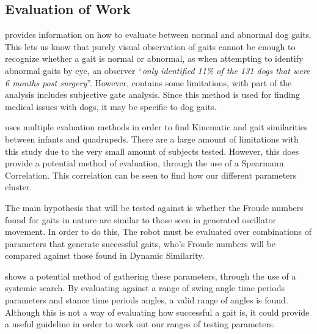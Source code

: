\subsection{Evaluation of Work}



\cite{Carr2016} provides information on how to evaluate between normal and abnormal dog gaits. This lets us know that purely visual observation of gaits cannot be enough to recognize whether a gait is normal or abnormal, as when attempting to identify abnormal gaits by eye, an observer ``\textit{only identified 11\% of the 131 dogs that were 6 months post surgery}''. However, \cite{Carr2016} contains some limitations, with part of the analysis includes subjective gate analysis. Since this method is used for finding medical issues with dogs, it may be specific to dog gaits.

\citep{Righetti2015} uses multiple evaluation methods in order to find Kinematic and gait similarities between infants and quadrupeds. There are a large amount of limitations with this study due to the very small amount of subjects tested. However, this does provide a potential method of evaluation, through the use of a Spearmann Correlation. This correlation can be seen to find how our different parameters cluster.

The main hypothesis that will be tested against is whether the Froude numbers found for gaits in nature are similar to those seen in generated oscillator movement. In order to do this, The robot must be evaluated over combinations of parameters that generate successful gaits, who's Froude numbers will be compared against those found in Dynamic Similarity.


\cite{Rutishauser2008} shows a potential method of gathering these parameters, through the use of a systemic search. By evaluating against a range of swing angle time periods parameters and stance time periods angles, a valid range of angles is found. Although this is not a way of evaluating how successful a gait is, it could provide a useful guideline in order to work out our ranges of testing parameters.


